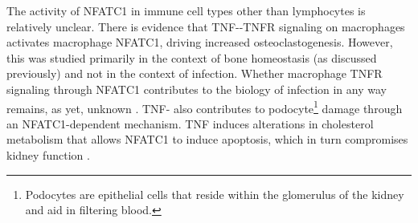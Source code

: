 The activity of NFATC1 in immune cell types other than lymphocytes is relatively unclear. There is evidence that TNF-\textalpha-TNFR signaling on macrophages activates macrophage NFATC1, driving increased osteoclastogenesis. However, this was studied primarily in the context of bone homeostasis (as discussed previously) and not in the context of infection. Whether macrophage TNFR signaling through NFATC1 contributes to the biology of infection in any way remains, as yet, unknown \citep{Yarilina2011}. TNF-\textalpha{} also contributes to podocyte\footnote{Podocytes are epithelial cells that reside within the glomerulus of the kidney and aid in filtering blood.} damage through an NFATC1-dependent mechanism. TNF induces alterations in cholesterol metabolism that allows NFATC1 to induce apoptosis, which in turn compromises kidney function \citep{Pedigo2016 Zhang2013}. 

